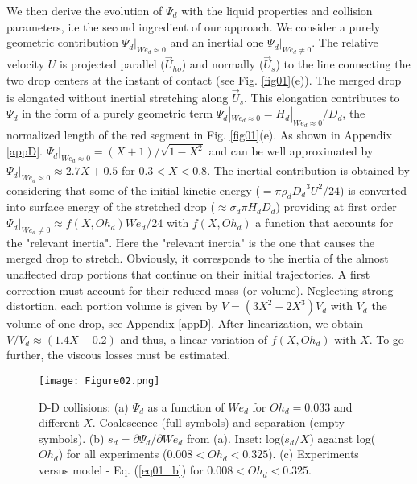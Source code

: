 \documentclass{article}
\begin{document}
 We then derive the evolution of $\Psi_d$ with the liquid properties and collision parameters{, i.e the second ingredient of our approach}. {We consider a purely geometric contribution $\Psi_d|_{We_d\approx0}$  and an inertial one $\Psi_d|_{We_d \neq 0}$}. The relative velocity $U$ is projected parallel ($\vec{U}_{ho}$) and normally ($\vec{U}_s$) to the  line connecting the two drop centers at the instant of contact (see  Fig. \ref{fig01}(e)). {The merged drop is elongated without inertial stretching along $\vec{U}_s$. This  elongation contributes to $\Psi_d$ in the form of a purely geometric term} $\Psi_d|_{We_d\approx0}=H_d|_{We_d\approx0}/D_d$, the normalized length of the red segment in Fig. \ref{fig01}(e). As shown in Appendix \ref{appD}. $\Psi_d|_{We_d\approx0}=(X+1)/\sqrt{1-X^2}$ and can  be well approximated by  $\Psi_d|_{We_d\approx0} \approx 2.7X+0.5$ for $0.3<X<0.8$. {The  inertial contribution is obtained by considering that some of the initial kinetic energy ($ = \pi \rho_d {D_d}^3 U^2 /24$)  is converted into surface energy of the stretched drop ($ \approx \sigma_d \pi H_d {D_d}$) providing at first order   $\Psi_d|_{We_d \neq 0} \approx f(X, Oh_d) We_d /24$ with $f(X, Oh_d)$ a function that accounts for the "relevant inertia". Here the "relevant inertia" is the one that causes the merged drop to stretch. Obviously, it corresponds to the inertia of } the almost unaffected drop portions that  continue on their initial trajectories. {A first correction must account for their reduced mass (or volume).} Neglecting strong  distortion, {each portion volume is given by  $V=(3X^2-2X^3)V_d$ with $V_d$  the volume of one drop, see Appendix \ref{appD}.  After linearization, we obtain $V/V_d \approx (1.4X-0.2)$ and thus, a linear variation of  $f(X, Oh_d)$ with $X$. To go further, the viscous losses must be estimated.}

\begin{figure}
\texttt{[image: Figure02.png]}
\caption{\label{fig02} D-D collisions: (a) $\Psi_d$ as a function of $We_d$ { for $Oh_d=0.033$} and different $X$. Coalescence (full symbols) and separation (empty symbols). (b) $s_d= \partial \Psi_d/ \partial We_d$ {from (a)}. Inset: log($s_d/X$) against log($Oh_d$) {for all experiments ($0.008<Oh_d<0.325$)}. (c) Experiments versus model - Eq. (\ref{eq01_b}) for $0.008<Oh_d<0.325$.}
\end{figure}
\end{document}

